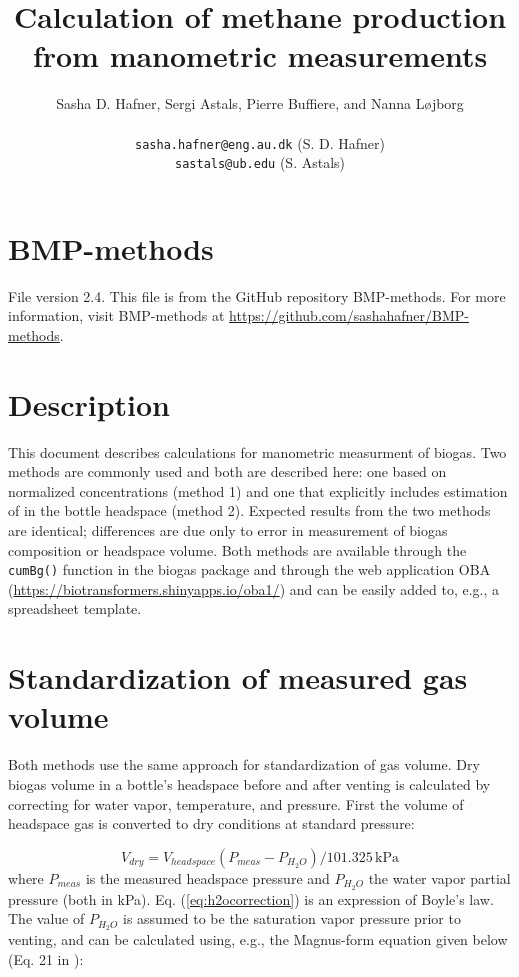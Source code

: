 \documentclass[]{article}
\title {Calculation of methane production from manometric measurements}
\author{Sasha D. Hafner, Sergi Astals, Pierre Buffiere, and Nanna L{\o}jborg\\
\\
\texttt{sasha.hafner@eng.au.dk} (S. D. Hafner)\\
\texttt{sastals@ub.edu} (S. Astals)\\
}
\newcommand{\unit}[1]{\ensuremath{\, \mathrm{#1}}}
\begin{document}
\maketitle

\section{BMP-methods}
File version 2.4. 
This file is from the GitHub repository BMP-methods.
For more information, visit BMP-methods at \url{https://github.com/sashahafner/BMP-methods}.

\section{Description}
This document describes calculations for manometric measurment of biogas.
Two methods are commonly used and both are described here: one based on normalized  concentrations (method 1) and one that explicitly includes estimation of  in the bottle headspace (method 2).
Expected results from the two methods are identical; differences are due only to error in measurement of biogas composition or headspace volume.
Both methods are available through the \texttt{cumBg()} function in the biogas package \cite{softwarex} and through the web application OBA (\url{https://biotransformers.shinyapps.io/oba1/}) and can be easily added to, e.g., a spreadsheet template.

\section{Standardization of measured gas volume}
Both methods use the same approach for standardization of gas volume.
Dry biogas volume in a bottle's headspace before and after venting is calculated by correcting for water vapor, temperature, and pressure.
First the volume of headspace gas is converted to dry conditions at standard pressure:

\begin{equation}
  \label{eq:h2ocorrection}
  V_{dry} = V_{headspace}(P_{meas} - P_{H_2O})/101.325 \unit{kPa}
\end{equation}
where $P_{meas}$ is the measured headspace pressure and $P_{H_2O}$ the water vapor partial pressure (both in kPa).
Eq. (\ref{eq:h2ocorrection}) is an expression of Boyle's law.
The value of $P_{H_2O}$ is assumed to be the saturation vapor pressure prior to venting, and can be calculated using, e.g., the Magnus-form equation given below (Eq. 21 in \cite{magnus}):
\end{document}
